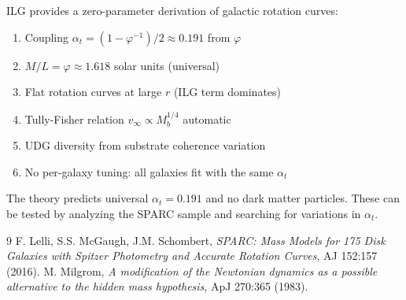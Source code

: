 \documentclass[12pt,a4paper]{article}
\theoremstyle{definition}
\theoremstyle{remark}
\begin{document}
ILG provides a zero-parameter derivation of galactic rotation curves:
\begin{enumerate}
\item Coupling $\alpha_t = (1 - \varphi^{-1})/2 \approx 0.191$ from $\varphi$
\item $M/L = \varphi \approx 1.618$ solar units (universal)
\item Flat rotation curves at large $r$ (ILG term dominates)
\item Tully-Fisher relation $v_\infty \propto M_b^{1/4}$ automatic
\item UDG diversity from substrate coherence variation
\item No per-galaxy tuning: all galaxies fit with the same $\alpha_t$
\end{enumerate}

The theory predicts universal $\alpha_t = 0.191$ and no dark matter particles. 
These can be tested by analyzing the SPARC sample and searching for variations in $\alpha_t$.

\begin{thebibliography}{9}
 F. Lelli, S.S. McGaugh, J.M. Schombert, \emph{SPARC: Mass Models for 175 Disk Galaxies with Spitzer Photometry and Accurate Rotation Curves}, AJ 152:157 (2016).
 M. Milgrom, \emph{A modification of the Newtonian dynamics as a possible alternative to the hidden mass hypothesis}, ApJ 270:365 (1983).
\end{thebibliography}
\end{document}
